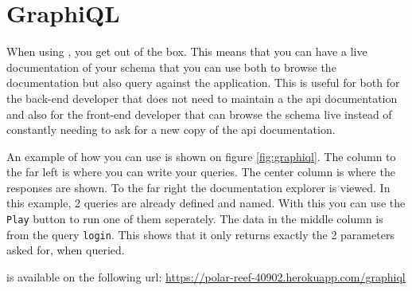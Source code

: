 \section{GraphiQL}
When using , you get  out of the box.
This means that you can have a live documentation of your schema that you can use both to browse the documentation but also query against the application.
This is useful for both for the back-end developer that does not need to maintain a the \gls{api} documentation and also for the front-end developer that can browse the schema live instead of constantly needing to ask for a new copy of the \gls{api} documentation.

An example of how you can use  is shown on figure \ref{fig:graphiql}. 
The column to the far left is where you can write your queries.
The center column is where the  responses are shown.
To the far right the documentation explorer is viewed.
In this example, 2 queries are already defined and named. 
With this you can use the \verb+Play+ button to run one of them seperately.
The data in the middle column is from the query \verb+login+.
This shows that it only returns exactly the 2 parameters asked for, when queried.

 is available on the following \gls{url}: \newline
\url{https://polar-reef-40902.herokuapp.com/graphiql}

